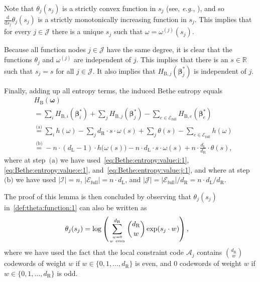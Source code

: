 \documentclass[journal, twocolumn]{IEEEtran}
\newcommand{\eg}{\emph{e.g.}}
\newcommand{\R}{\mathbb{R}}
\newcommand{\set}[1]{\mathcal{#1}}
\newcommand{\onestareq}{\overset{\text{(a)}}{=}}
\newcommand{\twostarseq}{\overset{\text{(b)}}{=}}
\newcommand{\onestar}{\text{(a)}}
\newcommand{\twostars}{\text{(b)}}
\newcommand{\bel}{\beta}
\newcommand{\vbels}{\boldsymbol{\bel}^{*}}
\newcommand{\setA}{\set{A}}
\newcommand{\setEfull}{\set{E}_{\mathrm{full}}}
\newcommand{\setI}{\set{I}}
\newcommand{\setJ}{\set{J}}
\newcommand{\rdiff}[1]{\frac{\mathrm{d}}{\mathrm{d}#1}}
\newcommand{\vomega}{\boldsymbol{\omega}}
\newcommand{\dleft}{d_{\mathrm{L}}}
\newcommand{\dright}{d_{\mathrm{R}}}
\newcommand{\HBethe}{H_{\mathrm{B}}}
\newcommand{\HBethesub}[1]{H_{\mathrm{B},#1}}
\newcommand{\?}{\mathrm{?}}
\begin{document}
Note that $\theta_j(s_j)$ is a strictly convex function in $s_j$ (see, \eg,
\cite{Boyd:Vandenberghe:04:1}), and so $\rdiff{s_j} \theta_j(s_j)$ is a
strictly monotonically increasing function in $s_j$. This implies that for
every $j \in \setJ$ there is a unique $s_j$ such that $\omega =
\omega^{(j)}(s_j)$.

Because all function nodes $j \in \setJ$ have the same degree, it is clear
that the functions $\theta_j$ and $\omega^{(j)}$ are independent of $j$. This
implies that there is an $s \in \R$ such that $s_j = s$ for all $j \in
\setJ$. It also implies that $\HBethesub{j}(\vbels_j)$ is independent of $j$.

Finally, adding up all entropy terms, the induced Bethe entropy equals
\begin{align*}
  &
  \HBethe(\vomega) \\
    &= \sum_i
         \HBethesub{i}(\vbels_i)
       +
       \sum_j
         \HBethesub{j}(\vbels_j)
       -
       \sum_{e \in \setEfull}
         \HBethesub{e}(\vbels_e) \\
    &\onestareq
       \sum_i
         h(\omega)
       -
       \sum_j
         \dright \cdot s \cdot \omega(s)
       +
       \sum_j
         \theta(s)
       -
       \sum_{e \in \setEfull}
         h(\omega) \\
    &\twostarseq
       -
       n
       \cdot
       (\dleft \! - \! 1) \cdot h\big( \omega(s) \big)
       -
       n
       \cdot
       \dleft \cdot s \cdot \omega(s)
       +
       n
       \cdot
       \frac{\dleft}{\dright}
       \cdot
       \theta(s),
\end{align*}
where at step~$\onestar$ we have used~\eqref{eq:Bethe:entropy:value:i:1},
\eqref{eq:Bethe:entropy:value:e:1}, and~\eqref{eq:Bethe:entropy:value:j:1},
and where at step~$\twostars$ we have used $|\setI| = n$, $|\setEfull| = n
\cdot \dleft$, and $|\setJ| = |\setEfull| / \dright = n \cdot \dleft /
\dright$.

The proof of this lemma is then concluded by observing that $\theta_j(s_j)$
in~\eqref{def:theta:function:1} can also be written as
\begin{align}
  \theta_j(s_j)
    &= \log
         \left(
           \sum_{w = 0 \atop w \ \mathrm{even}}^{\dright}
             {\dright \choose w}
             \exp(s_j \cdot w)
         \right),
\end{align}
where we have used the fact that the local constraint code $\setA_j$ contains
${\dright \choose w}$ codewords of weight $w$ if $w \in \{ 0, 1, \ldots,
\dright \}$ is even, and $0$ codewords of weight $w$ if $w \in \{ 0, 1,
\ldots, \dright \}$ is odd.





\end{document}
